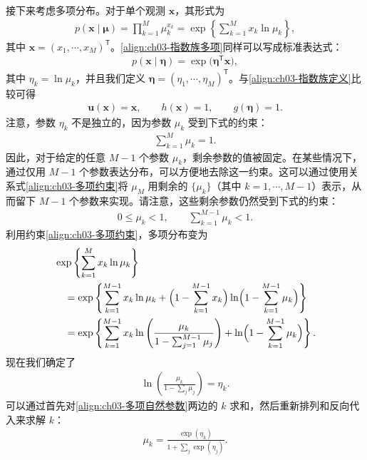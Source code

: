 \documentclass[../../main.tex]{subfiles}
\begin{document}
接下来考虑多项分布。对于单个观测 $\boldsymbol{x}$，其形式为
\begin{align}
p(\boldsymbol{x}\mid\boldsymbol{\mu})=\prod_{k=1}^{M}\mu_k^{x_k}=\exp\left\{\sum_{k=1}^{M}x_k\ln\mu_k\right\},
\label{align:ch03-指数族多项}
\end{align}
其中 $\boldsymbol{x}=(x_1,\cdots,x_M)^{\mathsf{T}}$。\eqref{align:ch03-指数族多项}同样可以写成标准表达式：
\begin{align}
p(\boldsymbol{x}\mid\boldsymbol{\eta})=\exp\bigl(\boldsymbol{\eta}^{\mathsf{T}}\boldsymbol{x}\bigr),
\label{align:ch03-多项指数族}
\end{align}
其中 $\eta_k=\ln\mu_k$，并且我们定义 $\boldsymbol{\eta}=(\eta_1,\cdots,\eta_M)^{\mathsf{T}}$。与\eqref{align:ch03-指数族定义}比较可得
\begin{align}
\boldsymbol{u}(\boldsymbol{x})=\boldsymbol{x},\qquad h(\boldsymbol{x})=1,\qquad g(\boldsymbol{\eta})=1.
\label{align:ch03-多项指数族参数}
\end{align}
注意，参数 $\eta_k$ 不是独立的，因为参数 $\mu_k$ 受到下式的约束：
\begin{align}
\sum_{k=1}^{M}\mu_k=1.
\label{align:ch03-多项约束}
\end{align}
因此，对于给定的任意 $M-1$ 个参数 $\mu_k$，剩余参数的值被固定。在某些情况下，通过仅用 $M-1$ 个参数表达分布，可以方便地去除这一约束。这可以通过使用关系式\eqref{align:ch03-多项约束}将 $\mu_M$ 用剩余的 $\{\mu_k\}$（其中 $k=1,\cdots,M-1$）表示，从而留下 $M-1$ 个参数来实现。请注意，这些剩余参数仍然受到下式的约束：
\begin{align}
0\leqslant\mu_k<1,\qquad \sum_{k=1}^{M-1}\mu_k<1.
\label{align:ch03-多项剩余约束}
\end{align}
利用约束\eqref{align:ch03-多项约束}，多项分布变为
\begin{align}
&\exp\left\{\sum_{k=1}^{M}x_k\ln\mu_k\right\}\nonumber\\
&\quad=\exp\left\{\sum_{k=1}^{M-1}x_k\ln\mu_k+\Bigl(1-\sum_{k=1}^{M-1}x_k\Bigr)\ln\Bigl(1-\sum_{k=1}^{M-1}\mu_k\Bigr)\right\}\nonumber\\
&\quad=\exp\left\{\sum_{k=1}^{M-1}x_k\ln\left(\frac{\mu_k}{1-\sum_{j=1}^{M-1}\mu_j}\right)+\ln\Bigl(1-\sum_{k=1}^{M-1}\mu_k\Bigr)\right\}.
\label{align:ch03-多项重写}
\end{align}
现在我们确定了
\begin{align}
\ln\left(\frac{\mu_k}{1-\sum_{j}\mu_j}\right)=\eta_k.
\label{align:ch03-多项自然参数}
\end{align}
可以通过首先对\eqref{align:ch03-多项自然参数}两边的 $k$ 求和，然后重新排列和反向代入来求解 $k$：
\begin{align}
\mu_k=\frac{\exp(\eta_k)}{1+\sum_{j}\exp(\eta_j)}.
\label{align:ch03-softmax}
\end{align}
\end{document}
